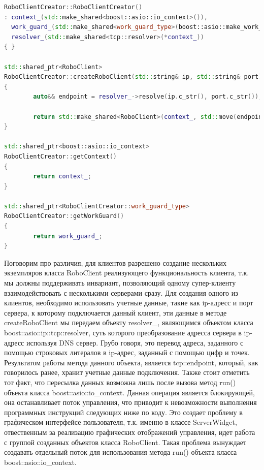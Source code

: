 \documentclass[a4paper, 14pt]{extreport}
\begin{document}
\begin{lstlisting}[language=C++, frame=single, xleftmargin=15pt, caption={Определение методов класса RoboClientCreator},label=DescriptiveLabel]
RoboClientCreator::RoboClientCreator()
: context_(std::make_shared<boost::asio::io_context>()),
  work_guard_(std::make_shared<work_guard_type>(boost::asio::make_work_guard(*context_))),
  resolver_(std::make_shared<tcp::resolver>(*context_))
{ }

std::shared_ptr<RoboClient>
RoboClientCreator::createRoboClient(std::string& ip, std::string& port)
{
        auto&& endpoint = resolver_->resolve(ip.c_str(), port.c_str());

        return std::make_shared<RoboClient>(context_, std::move(endpoint));
}

std::shared_ptr<boost::asio::io_context>
RoboClientCreator::getContext()
{
        return context_;
}

std::shared_ptr<RoboClientCreator::work_guard_type>
RoboClientCreator::getWorkGuard()
{
        return work_guard_;
}
\end{lstlisting}
\par Поговорим про различия, для клиентов разрешено создание нескольких экземпляров класса RoboClient реализующего функциональность 
клиента, т.к. мы должны поддерживать инвариант, позволяющий одному супер-клиенту взаимодействовать с несколькими серверами сразу.
Для создания одного из клиентов, необходимо использовать учетные данные, такие как ip-адресс и порт сервера, к которому подключается 
данный клиент, эти данные в методе createRoboClient мы передаем объекту resolver\_, являющимся объектом класса boost::asio::ip::tcp::resolver,
суть которого преобразование адресса сервера в ip-адресс используя DNS сервер. Грубо говоря, это перевод адреса, заданного с помощью 
строковых литералов в ip-адрес, заданный с помощью цифр и точек. Результатом работы метода данного объекта, является tcp::endpoint, 
который, как говорилось ранее, хранит учетные данные подключения. Также стоит отметить тот факт, что пересылка данных возможна лишь 
после вызова метод run() объекта класса boost::asio::io\_context. Данная операция является блокирующей, она останавливает поток управления,
что приводит к невозможности выполнения программных инструкций следующих ниже по коду. Это создает проблему в графическом интерфейсе пользователя,
т.к. именно в классе ServerWidget, отвественным за реализацию графических отображений управления, идет работа с группой созданных объектов 
класса RoboClient. Такая проблема вынуждает создавать отдельный поток для использования метода run() объекта класса boost::asio::io\_context.
\end{document}
